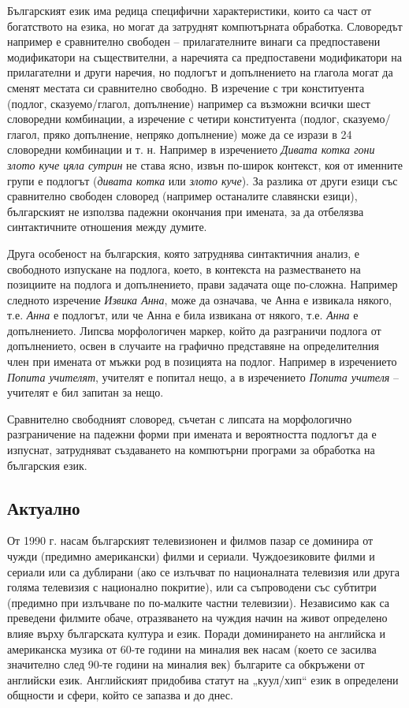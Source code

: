 \documentclass[]{../../metanetpaper}
\begin{document}
\begin{multicols}{2}
Българският език има редица специфични характеристики, които са част от богатството на езика, но могат
 да затруднят компютърната обработка. Словоредът например е
 сравнително свободен – прилагателните винаги са
 предпоставени модификатори на съществителни, а
 наречията
 са предпоставени
 модификатори
 на
 прилагателни и други наречия, но подлогът и
 допълнението на глагола могат да сменят местата си
 сравнително свободно. В изречение с три конституента
 (подлог, сказуемо/глагол, допълнение) например са
 възможни всички шест словоредни комбинации, а
 изречение
 с четири
 конституента
 (подлог,
 сказуемо/глагол,
 пряко допълнение,
 непряко
 допълнение) може да се изрази в 24 словоредни
 комбинации и т. н. Например в изречението \textit{Дивата
 котка гони злото куче цяла сутрин} не става ясно, извън
 по-широк контекст, коя от именните групи е подлогът
 (\textit{дивата котка} или  \textit{злото куче}). За разлика от други езици
 със сравнително свободен
 словоред
 (например
 останалите славянски езици), българският не използва
 падежни окончания при имената, за да отбелязва
 синтактичните отношения между думите.

Друга особеност на българския, която затруднява синтактичния анализ, е свободното изпускане на подлога, което, в контекста на разместването на позициите на подлога и допълнението, прави задачата
 още по-сложна. Например следното
 изречение \textit{Извика Анна}, може да означава, че
 Анна е извикала някого, т.е.  \textit{Анна} е подлогът, или че
 Анна е била извикана от някого, т.е.  \textit{Анна} е
 допълнението. Липсва морфологичен маркер, който да
 разграничи подлога от допълнението, освен в случаите
 на графично представяне на определителния член при имената от мъжки род в позицията на подлог. Например
 в изречението \textit{Попита учителят}, учителят е попитал
 нещо, а в изречението \textit{Попита учителя} – учителят е бил
 запитан за нещо.
 
Сравнително свободният словоред, съчетан с липсата на
 морфологично разграничение на падежни форми при
 имената и вероятността подлогът да е изпуснат, затрудняват създаването на компютърни програми за обработка на българския език.

\subsection{Актуално}

От 1990 г. насам българският телевизионен и филмов пазар се доминира от чужди (предимно американски) филми и сериали. Чуждоезиковите филми и сериали или са дублирани (ако
 се излъчват по националната телевизия или друга
 голяма телевизия с национално покритие), или са
 съпроводени със субтитри (предимно при излъчване по
 по-малките частни телевизии). Независимо как са
 преведени филмите обаче, отразяването на чуждия начин на живот
 определено влияе върху българската култура и
 език. Поради
 доминирането
 на
 английска и американска музика от 60-те години на миналия век насам (което се засилва значително след
 90-те години на миналия век) българите
са обкръжени от английски език.
 Английският придобива статут на „куул/хип“
 език в определени общности и сфери, който се запазва и до днес. 


\end{multicols}
\end{document}
